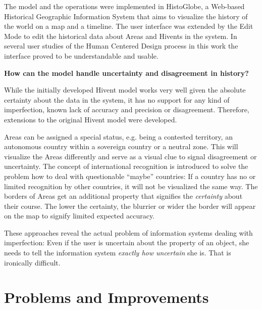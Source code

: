 The model and the operations were implemented in HistoGlobe, a Web-based Historical Geographic Information System that aims to visualize the history of the world on a map and a timeline. The user interface was extended by the Edit Mode to edit the historical data about Areas and Hivents in the system. In several user studies of the Human Centered Design process in this work the interface proved to be understandable and usable.

\begin{description}[labelindent=0.55em]
  \item[\textbf{3)}]
  \textbf{
    How can the model handle uncertainty and disagreement in history?
  }
\end{description}

While the initially developed Hivent model works very well given the absolute certainty about the data in the system, it has no support for any kind of imperfection, known lack of accuracy and precision or disagreement. Therefore, extensions to the original Hivent model were developed.

Areas can be assigned a special status, e.g. being a contested territory, an autonomous country within a sovereign country or a neutral zone. This will visualize the Areas differently and serve as a visual clue to signal disagreement or uncertainty. The concept of international recognition is introduced to solve the problem how to deal with questionable ``maybe'' countries: If a country has no or limited recognition by other countries, it will not be visualized the same way. The borders of Areas get an additional property that signifies the \emph{certainty} about their course. The lower the certainty, the blurrier or wider the border will appear on the map to signify limited expected accuracy.

These approaches reveal the actual problem of information systems dealing with imperfection: Even if the user is uncertain about the property of an object, she needs to tell the information system \emph{exactly how uncertain} she is. That is ironically difficult.


\section{Problems and Improvements} %
\label{sec:problems}

